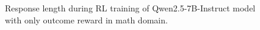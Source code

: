 \begin{figure}[h!]
    \centering
    \begin{subfigure}[b]{0.6\textwidth}
        \centering
        \label{fig:qwen_rl_math}
    \end{subfigure}

 \caption{Response length during RL training of Qwen2.5-7B-Instruct model with only outcome reward in math domain.}
 \label{fig:qwen_result_math}
\end{figure}